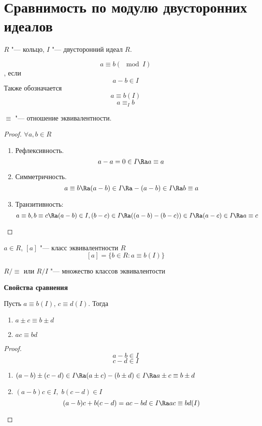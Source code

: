 ﻿\section{Сравнимость по модулю двусторонних идеалов}

\begin{Def}
$R$ "--- кольцо,	
$I$ "--- двусторонний идеал $R$.

\[a \equiv b (\mod I)\], если
\[a - b \in I\]
Также обозначается
\[a \equiv b (I)\]
\[a \equiv_I b\]
\end{Def}

\begin{Rem}
	$\equiv$ "--- отношение эквивалентности.
\end{Rem}
	
\begin{proof}
	$ \forall a, b \in R$
	\begin{enumerate}
		\item Рефлексивность.
			\[a - a = 0 \in I \Ra a \equiv a\]
		\item Симметричность. 
			\[a \equiv b \Ra (a - b) \in I \Ra -(a - b) \in I \Ra b \equiv a\]
		\item Транзитивность: 
			\[a \equiv b, b \equiv c \Ra (a - b) \in I, (b - c) \in I 
			\Ra ((a - b) - (b - c)) \in I \Ra (a - c) \in I \Ra a \equiv c\]
	\end{enumerate}
\end{proof}

\begin{Def}
	$a \in R$,
	$[a]$ "--- класс эквивалентности $R$
	\[ [a] = \{b \in R \colon a \equiv b (I) \} \]
	\begin{center}
		$R/ \equiv$ или $R/I$ "--- множество классов эквивалентости
	\end{center}
\end{Def}

\textbf{Свойства сравнения}

Пусть $a \equiv b (I)$, $c \equiv d (I)$. Тогда
\begin{enumerate}
	\item $a \pm c \equiv b \pm d$
	\item $ac \equiv bd$
\end{enumerate}
	
\begin{proof}
	\[a - b \in I\]
	\[c - d \in I\]
	\begin{enumerate}
		\item $(a - b) \pm (c - d) \in I \Ra
			(a \pm c) - (b \pm d) \in I \Ra a \pm c \equiv b \pm d$
		\item $(a - b) c \in I,$
		$b (c - d) \in I$
		\[(a - b) c + b (c - d) = ac - bd \in I \Ra ac \equiv bd (I)\]
	\end{enumerate}
\end{proof}
	
